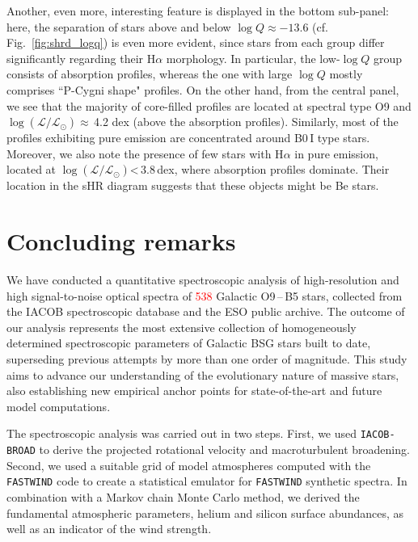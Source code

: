 \documentclass{aa}
\newcommand{\logQ}{\mbox{$\log Q$}\xspace}
\newcommand{\logLs}{$\log (\mathcal{L}/\mathcal{L}_{\odot})$\xspace}
\newcommand{\num}[1]{\textcolor{red}{#1}}
\begin{document}
Another, even more, interesting feature is displayed in the bottom sub-panel: here, the separation of stars above and below \logQ$\approx-13.6$ (cf. Fig.~\ref{fig:shrd_logq}) is even more evident, since stars from each group differ significantly regarding their H$\alpha$ morphology. In particular, the low-\logQ group consists of absorption profiles, whereas the one with large \logQ mostly comprises ``P-Cygni shape" profiles. On the other hand, from the central panel, we see that the majority of core-filled profiles are located at spectral type O9 and \logLs$\approx$\,4.2 dex (above the absorption profiles). Similarly, most of the profiles exhibiting pure emission are concentrated around B0\,I type stars. Moreover, we also note the presence of few stars with H$\alpha$ in pure emission, located at \logLs<\,3.8\,dex, where absorption profiles dominate. Their location in the sHR diagram suggests that these objects might be Be stars.






\section{Concluding remarks}
\label{section:6_tmp}

We have conducted a quantitative spectroscopic analysis of high-resolution and high signal-to-noise optical spectra of \num{538} Galactic O9\,--\,B5 stars, collected from the IACOB spectroscopic database and the ESO public archive. The outcome of our analysis represents the most extensive collection of homogeneously determined spectroscopic parameters of Galactic BSG stars built to date, superseding previous attempts by more than one order of magnitude. This study aims to advance our understanding of the evolutionary nature of massive stars, also establishing new empirical anchor points for state-of-the-art and future model computations.

The spectroscopic analysis was carried out in two steps. First, we used {\tt IACOB-BROAD} to derive the projected rotational velocity and macroturbulent broadening. Second, we used a suitable grid of model atmospheres computed with the {\tt FASTWIND} code to create a statistical emulator for {\tt FASTWIND} synthetic spectra. In combination with a Markov chain Monte Carlo method, we derived the fundamental atmospheric parameters, helium and silicon surface abundances, as well as an indicator of the wind strength.  
\end{document}
